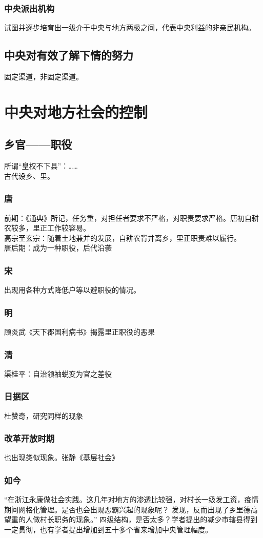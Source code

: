 \documentclass[twoside]{article}
\begin{document}
\subsubsection{中央派出机构}
试图并逐步培育出一级介于中央与地方两极之间，代表中央利益的非亲民机构。
\subsection{中央对有效了解下情的努力}
固定渠道，非固定渠道。
\section{中央对地方社会的控制}
\subsection{乡官——职役}
所谓``皇权不下县''：……\\
古代设乡、里。\\
\subsubsection{唐}
前期：《通典》所记，任务重，对担任者要求不严格，对职责要求严格。唐初自耕农较多，里正工作较容易。\\
高宗至玄宗：随着土地兼并的发展，自耕农背井离乡，里正职责难以履行。\\
唐后期：成为一种职役，后代沿袭
\subsubsection{宋}
出现用各种方式降低户等以避职役的情况。\\
\subsubsection{明}
顾炎武《天下郡国利病书》揭露里正职役的恶果
\subsubsection{清}
渠桂平：自治领袖蜕变为官之差役
\subsubsection{日据区}
杜赞奇，研究同样的现象
\subsubsection{改革开放时期}
也出现类似现象。张静《基层社会》
\subsubsection{如今}
``在浙江永康做社会实践。这几年对地方的渗透比较强，对村长一级发工资，疫情期间网格化管理。是否也会出现恶霸兴起的现象呢？
发现，反而出现了乡里德高望重的人做村长职务的现象。''
四级结构，是否太多？学者提出的减少市辖县得到一定贯彻，也有学者提出增加到五十多个省来增加中央管理幅度。
\end{document}
